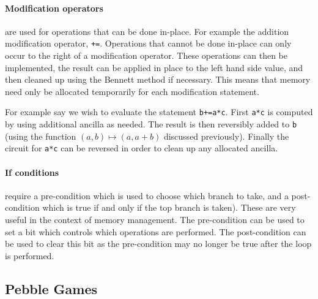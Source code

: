 \paragraph{Modification operators} are used for operations that can be done
in-place\footnotemark. For example the addition modification operator, \verb|+=|. Operations
that cannot be done in-place can only occur to the right of a modification
operator. These operations can then be implemented, the result can be applied in
place to the left hand side value, and then cleaned up using the Bennett method if
necessary. This means that memory need only be allocated temporarily for each
modification statement.


For example say we wish to evaluate the statement \verb|b+=a*c|\footnotemark.
First \verb|a*c| is computed by using additional ancilla as needed. The result
is then reversibly added to \verb|b| (using the function $(a,b)\mapsto(a,a+b)$
discussed previously). Finally the circuit for \verb|a*c| can be reversed in
order to clean up any allocated ancilla.


\paragraph{If conditions} require a pre-condition which is used to choose which
branch to take, and a post-condition which is true if and only if the top
branch is taken). These are very useful in the
context of memory management. The pre-condition can be used to set a bit which
controls which operations are performed. The post-condition can be used to
clear this bit as the pre-condition may no longer be true after the loop is
performed.


\subsection{Pebble Games}

